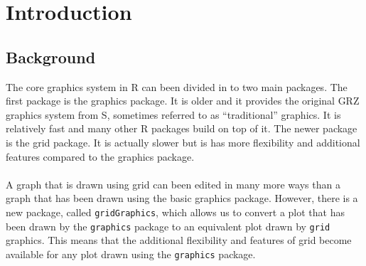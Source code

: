 \documentclass[a4paper,10pt]{article}\usepackage[]{graphicx}\usepackage[]{color}
\begin{document}
\section{Introduction}

\subsection{Background}
The core graphics system in R can been divided in to two main packages. The first package is the graphics package. It is older and it provides the original GRZ graphics system from S, sometimes referred to as ``traditional'' graphics. It is relatively fast and many other R packages build on top of it. The newer package is the grid package. It is actually slower but is has more flexibility and additional features compared to the graphics package. \\\\
A graph that is drawn using grid can been edited in many more ways than a graph that has been drawn using the basic graphics package. However, there is a new package, called \texttt{gridGraphics}, which allows us to convert a plot that has been drawn by the \texttt{graphics} package to an equivalent plot drawn by \texttt{grid} graphics. This means that the additional flexibility and features of grid become available for any plot drawn using the \texttt{graphics} package. 

\newpage
\end{document}
